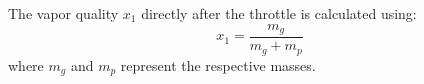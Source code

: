 The vapor quality \( x_1 \) directly after the throttle is calculated using:  
\[
x_1 = \frac{m_g}{m_g + m_p}
\]  
where \( m_g \) and \( m_p \) represent the respective masses.